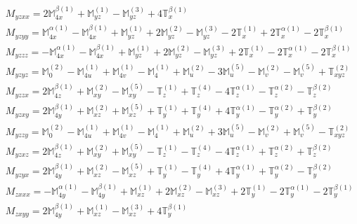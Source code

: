 \documentclass[fleqn,8pt,landscape]{jsarticle}
\begin{document}
\begin{align*}
& M_{yzxx} = 2 \mathbb{M}_{4x}^{\beta(1)} + \mathbb{M}_{yz}^{(1)} - \mathbb{M}_{yz}^{(3)} + 4 \mathbb{T}_{x}^{\beta(1)} \\
& M_{yzyy} = \mathbb{M}_{4x}^{\alpha(1)} - \mathbb{M}_{4x}^{\beta(1)} + \mathbb{M}_{yz}^{(1)} + 2 \mathbb{M}_{yz}^{(2)} - \mathbb{M}_{yz}^{(3)} - 2 \mathbb{T}_{x}^{(1)} + 2 \mathbb{T}_{x}^{\alpha(1)} - 2 \mathbb{T}_{x}^{\beta(1)} \\
& M_{yzzz} = - \mathbb{M}_{4x}^{\alpha(1)} - \mathbb{M}_{4x}^{\beta(1)} + \mathbb{M}_{yz}^{(1)} + 2 \mathbb{M}_{yz}^{(2)} - \mathbb{M}_{yz}^{(3)} + 2 \mathbb{T}_{x}^{(1)} - 2 \mathbb{T}_{x}^{\alpha(1)} - 2 \mathbb{T}_{x}^{\beta(1)} \\
& M_{yzyz} = \mathbb{M}_{0}^{(2)} - \mathbb{M}_{4u}^{(1)} + \mathbb{M}_{4v}^{(1)} - \mathbb{M}_{4}^{(1)} + \mathbb{M}_{u}^{(2)} - 3 \mathbb{M}_{u}^{(5)} - \mathbb{M}_{v}^{(2)} - \mathbb{M}_{v}^{(5)} + \mathbb{T}_{xyz}^{(2)} \\
& M_{yzzx} = 2 \mathbb{M}_{4z}^{\beta(1)} + \mathbb{M}_{xy}^{(2)} - \mathbb{M}_{xy}^{(5)} - \mathbb{T}_{z}^{(1)} + \mathbb{T}_{z}^{(4)} - 4 \mathbb{T}_{z}^{\alpha(1)} - \mathbb{T}_{z}^{\alpha(2)} - \mathbb{T}_{z}^{\beta(2)} \\
& M_{yzxy} = 2 \mathbb{M}_{4y}^{\beta(1)} + \mathbb{M}_{xz}^{(2)} + \mathbb{M}_{xz}^{(5)} + \mathbb{T}_{y}^{(1)} + \mathbb{T}_{y}^{(4)} + 4 \mathbb{T}_{y}^{\alpha(1)} - \mathbb{T}_{y}^{\alpha(2)} + \mathbb{T}_{y}^{\beta(2)} \\
& M_{yzzy} = \mathbb{M}_{0}^{(2)} - \mathbb{M}_{4u}^{(1)} + \mathbb{M}_{4v}^{(1)} - \mathbb{M}_{4}^{(1)} + \mathbb{M}_{u}^{(2)} + 3 \mathbb{M}_{u}^{(5)} - \mathbb{M}_{v}^{(2)} + \mathbb{M}_{v}^{(5)} - \mathbb{T}_{xyz}^{(2)} \\
& M_{yzxz} = 2 \mathbb{M}_{4z}^{\beta(1)} + \mathbb{M}_{xy}^{(2)} + \mathbb{M}_{xy}^{(5)} - \mathbb{T}_{z}^{(1)} - \mathbb{T}_{z}^{(4)} - 4 \mathbb{T}_{z}^{\alpha(1)} + \mathbb{T}_{z}^{\alpha(2)} + \mathbb{T}_{z}^{\beta(2)} \\
& M_{yzyx} = 2 \mathbb{M}_{4y}^{\beta(1)} + \mathbb{M}_{xz}^{(2)} - \mathbb{M}_{xz}^{(5)} + \mathbb{T}_{y}^{(1)} - \mathbb{T}_{y}^{(4)} + 4 \mathbb{T}_{y}^{\alpha(1)} + \mathbb{T}_{y}^{\alpha(2)} - \mathbb{T}_{y}^{\beta(2)} \\
& M_{zxxx} = - \mathbb{M}_{4y}^{\alpha(1)} - \mathbb{M}_{4y}^{\beta(1)} + \mathbb{M}_{xz}^{(1)} + 2 \mathbb{M}_{xz}^{(2)} - \mathbb{M}_{xz}^{(3)} + 2 \mathbb{T}_{y}^{(1)} - 2 \mathbb{T}_{y}^{\alpha(1)} - 2 \mathbb{T}_{y}^{\beta(1)} \\
& M_{zxyy} = 2 \mathbb{M}_{4y}^{\beta(1)} + \mathbb{M}_{xz}^{(1)} - \mathbb{M}_{xz}^{(3)} + 4 \mathbb{T}_{y}^{\beta(1)} \\

\end{align*}
\end{document}

